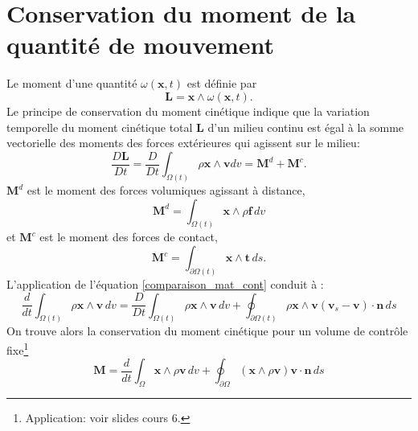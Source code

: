 \section{Conservation du moment de la quantité de mouvement}
Le moment d'une quantité $\omega(\textbf{x},t)$ est définie par $$\textbf{L}=\textbf{x}\wedge\omega(\textbf{x},t).$$
Le principe de conservation du moment cinétique indique que la variation temporelle du moment cinétique total \textbf{L} d'un milieu continu est égal à la somme vectorielle des moments des forces extérieures qui agissent sur le milieu:
$$\frac{D\textbf{L}}{Dt}=\frac{D}{Dt}\int_{\Omega (t)}\rho\textbf{x}\wedge\textbf{v}dv=\textbf{M}^d+\textbf{M}^c.$$
$\textbf{M}^d$ est le moment des forces volumiques agissant à distance, $$\textbf{M}^d=\int_{\Omega (t)}\textbf{x}\wedge\rho\textbf{f}\,dv$$ et $\textbf{M}^c$ est le moment des forces de contact,
$$\textbf{M}^c=\int_{\partial\Omega (t)}\textbf{x}\wedge\textbf{t}\,ds.$$  
L'application de l'équation \ref{comparaison_mat_cont} conduit à : 
$$\frac{d}{dt}\int_{\Omega (t)}\rho\textbf{x}\wedge\textbf{v}\,dv=\frac{D}{Dt}\int_{\Omega (t)}\rho\textbf{x}\wedge\textbf{v}\,dv+\oint_{\partial\Omega (t)}\rho\textbf{x}\wedge\textbf{v}(\textbf{v}_s-\textbf{v})\cdot\textbf{\^n}\,ds$$
On trouve alors la conservation du moment cinétique pour un volume de contrôle fixe\footnote{Application: voir slides cours 6.}
$$\textbf{M}=\frac{d}{dt}\int_{\Omega}\textbf{x}\wedge\rho\textbf{v}\,dv+\oint_{\partial\Omega }(\textbf{x}\wedge\rho\textbf{v})\textbf{v}\cdot\textbf{\^n}\,ds$$
